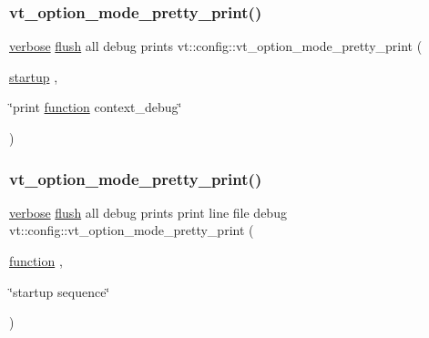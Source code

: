 \mbox{\label{namespacevt_1_1config_a8019230f6479fd998e4fd0f33a26a1a6}} 
\subsubsection{\texorpdfstring{vt\+\_\+option\+\_\+mode\+\_\+pretty\+\_\+print()}{vt\_option\_mode\_pretty\_print()}\hspace{0.1cm}{\footnotesize\ttfamily [3/4]}}
{\footnotesize\ttfamily \hyperlink{namespacevt_1_1config_a724e99568632cc0fe9c456c2230270d0a9b54bf70f7b7fe7cfb6f3da0e167ae27}{verbose} \hyperlink{namespacevt_1_1config_a724e99568632cc0fe9c456c2230270d0a5c484f36b0f33ded7e640cc30fe5e725}{flush} all debug prints vt\+::config\+::vt\+\_\+option\+\_\+mode\+\_\+pretty\+\_\+print (\begin{DoxyParamCaption}\item[{\hyperlink{namespacevt_1_1config_a724e99568632cc0fe9c456c2230270d0ad6e94cfdf66c00de0a906cec0f346d6b}{startup}}]{,  }\item[{\char`\"{}print \hyperlink{namespacevt_1_1config_a724e99568632cc0fe9c456c2230270d0a479a398ca7c07756b7f07ee19cb9b183}{function} context\+\_\+debug\char`\"{}}]{ }\end{DoxyParamCaption})}

\mbox{\label{namespacevt_1_1config_a287e502bd7dbdc1f80e3cadf4993d9ea}} 
\subsubsection{\texorpdfstring{vt\+\_\+option\+\_\+mode\+\_\+pretty\+\_\+print()}{vt\_option\_mode\_pretty\_print()}\hspace{0.1cm}{\footnotesize\ttfamily [4/4]}}
{\footnotesize\ttfamily \hyperlink{namespacevt_1_1config_a724e99568632cc0fe9c456c2230270d0a9b54bf70f7b7fe7cfb6f3da0e167ae27}{verbose} \hyperlink{namespacevt_1_1config_a724e99568632cc0fe9c456c2230270d0a5c484f36b0f33ded7e640cc30fe5e725}{flush} all debug prints print line file debug vt\+::config\+::vt\+\_\+option\+\_\+mode\+\_\+pretty\+\_\+print (\begin{DoxyParamCaption}\item[{\hyperlink{namespacevt_1_1config_a724e99568632cc0fe9c456c2230270d0a479a398ca7c07756b7f07ee19cb9b183}{function}}]{,  }\item[{\char`\"{}startup sequence\char`\"{}}]{ }\end{DoxyParamCaption})}



